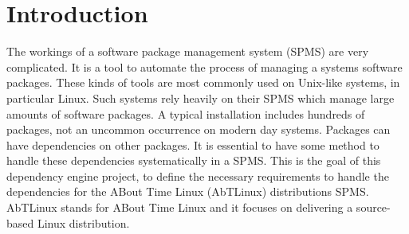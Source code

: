\section{Introduction}
The workings of a software package management system (SPMS) are very complicated. It is a tool to automate the process of managing a systems software packages. These kinds of tools are most commonly used on Unix-like systems, in particular Linux. Such systems rely heavily on their SPMS which manage large amounts of software packages. A typical installation includes hundreds of packages, not an uncommon occurrence on modern day systems. Packages can have dependencies on other packages. It is essential to have some method to handle these dependencies systematically in a SPMS. This is the goal of this dependency engine project, to define the necessary requirements to handle the dependencies for the ABout Time Linux (AbTLinux) distributions SPMS. AbTLinux stands for ABout Time Linux and it focuses on delivering a source-based Linux distribution.

